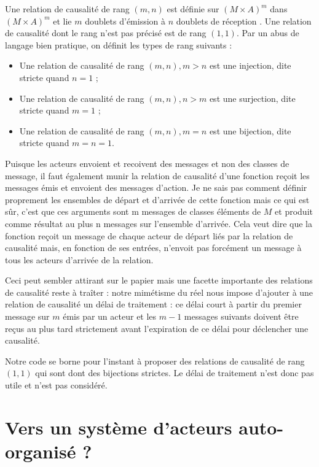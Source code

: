 \documentclass[11pt]{article}
\begin{document}
Une relation de causalité de rang $(m, n)$ est définie sur $\left(M×A\right)^m$ dans $\left(M×A\right)^m$ et lie $m$ doublets \og d'émission \fg{} à $n$ doublets \og de réception \fg{}. Une relation de causalité dont le rang n'est pas précisé est de rang $(1, 1)$. Par un abus de langage bien pratique, on définit les types de rang suivants :
\begin{itemize}
\item Une relation de causalité de rang $(m, n), m > n$ est une injection, dite stricte quand $n = 1$ ;
\item Une relation de causalité de rang $(m, n), n > m$ est une surjection, dite stricte quand $m = 1$ ;
\item Une relation de causalité de rang $(m, n), m = n$ est une bijection, dite stricte quand $m = n = 1$.
\end{itemize}

Puisque les acteurs envoient et recoivent des messages et non des classes de message, il faut également munir la relation de causalité d'une fonction reçoit les messages émis et envoient des messages d'action. Je ne sais pas comment définir proprement les ensembles de départ et d'arrivée de cette fonction mais ce qui est sûr, c'est que ces arguments sont m messages de classes éléments de $M$ et produit comme résultat au plus n messages sur l'ensemble d'arrivée. Cela veut dire que la fonction reçoit un message de chaque acteur de départ liés par la relation de causalité mais, en fonction de ses entrées, n'envoit pas forcément un message à tous les acteurs d'arrivée de la relation.

Ceci peut sembler attirant sur le papier mais une facette importante des relations de causalité reste à traîter : notre mimétisme du réel nous impose d'ajouter à une relation de causalité un délai de traitement : ce délai court à partir du premier message sur $m$ émis par un acteur et les $m - 1$ messages suivants doivent être reçus au plus tard strictement avant l'expiration de ce délai pour déclencher une causalité.

Notre code se borne pour l'instant à proposer des relations de causalité de rang $(1, 1)$ qui sont dont des bijections strictes. Le délai de traitement n'est donc pas utile et n'est pas considéré.

\section{Vers un système d'acteurs auto-organisé ?}\label{auto}
\end{document}
